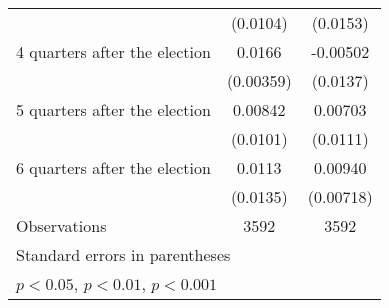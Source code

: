 \begin{table}[htbp]
\begin{tabular}{l*{2}{c}}
                    &    (0.0104)         &    (0.0153)         \\
[1em]
 4 quarters after the election&      0.0166\sym{***}&    -0.00502         \\
                    &   (0.00359)         &    (0.0137)         \\
[1em]
 5 quarters after the election&     0.00842         &     0.00703         \\
                    &    (0.0101)         &    (0.0111)         \\
[1em]
 6 quarters after the election&      0.0113         &     0.00940         \\
                    &    (0.0135)         &   (0.00718)         \\
\hline
Observations        &        3592         &        3592         \\
\hline\hline
\multicolumn{3}{l}{\footnotesize Standard errors in parentheses}\\
\multicolumn{3}{l}{\footnotesize \sym{*} \(p<0.05\), \sym{**} \(p<0.01\), \sym{***} \(p<0.001\)}\\
\end{tabular}
\end{table}

